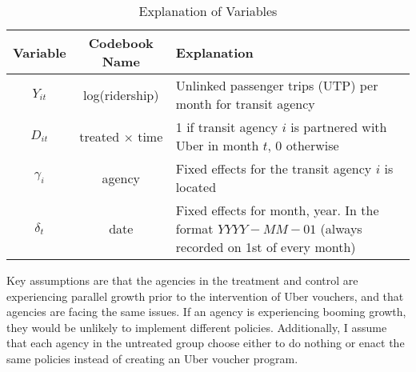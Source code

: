 \documentclass [11pt]{article}
\begin{document}
\begin{table}[H]
    \begin{minipage}{\textwidth}
        \caption{Explanation of Variables}
        \centering
        \begin{tabular}{|c|c|p{9cm}|}
            \hline
            \textbf{Variable} & \textbf{Codebook Name} & \textbf{Explanation} \\
            \hline
            $Y_{it}$ & log(ridership) & Unlinked passenger trips (UTP) per month for transit agency \\
            $D_{it}$ & treated $\times$ time & 1 if transit agency $i$ is partnered with Uber in month $t$, 0 otherwise \\
            $\gamma_i$ & agency & Fixed effects for the transit agency $i$ is located \\
            $\delta_t$ & date & Fixed effects for month, year. In the format $YYYY-MM-01$ (always recorded on 1st of every month)\\
            \hline
        \end{tabular}
    \end{minipage}
\end{table}
\indent Key assumptions are that the agencies in the treatment and control are experiencing parallel growth prior to the intervention of Uber vouchers, and that agencies are facing the same issues. If an agency is experiencing booming growth, they would be unlikely to implement different policies. Additionally, I assume that each agency in the untreated group choose either to do nothing or enact the same policies instead of creating an Uber voucher program.\\
\end{document}
